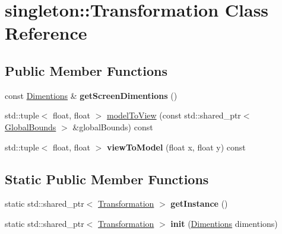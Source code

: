 \hypertarget{classsingleton_1_1_transformation}{}\section{singleton\+:\+:Transformation Class Reference}
\label{classsingleton_1_1_transformation}
\subsection*{Public Member Functions}
\begin{DoxyCompactItemize}
\item 
\mbox{\label{classsingleton_1_1_transformation_a45a811840e91388f25054019c28a27cd}} 
const \hyperlink{struct_dimentions}{Dimentions} \& {\bfseries get\+Screen\+Dimentions} ()
\item 
std\+::tuple$<$ float, float $>$ \hyperlink{classsingleton_1_1_transformation_a4db8bb77746a79641a057c19b30785c6}{model\+To\+View} (const std\+::shared\+\_\+ptr$<$ \hyperlink{struct_global_bounds}{Global\+Bounds} $>$ \&global\+Bounds) const
\item 
\mbox{\label{classsingleton_1_1_transformation_afc296e4278c48d0ab5345192e189669e}} 
std\+::tuple$<$ float, float $>$ {\bfseries view\+To\+Model} (float x, float y) const
\end{DoxyCompactItemize}
\subsection*{Static Public Member Functions}
\begin{DoxyCompactItemize}
\item 
\mbox{\label{classsingleton_1_1_transformation_ab4f0dbbfe1889d5c9f1b70131ba640d5}} 
static std\+::shared\+\_\+ptr$<$ \hyperlink{classsingleton_1_1_transformation}{Transformation} $>$ {\bfseries get\+Instance} ()
\item 
\mbox{\label{classsingleton_1_1_transformation_acef1b7fefa4473eaa785eb42b8ae6066}} 
static std\+::shared\+\_\+ptr$<$ \hyperlink{classsingleton_1_1_transformation}{Transformation} $>$ {\bfseries init} (\hyperlink{struct_dimentions}{Dimentions} dimentions)
\end{DoxyCompactItemize}


